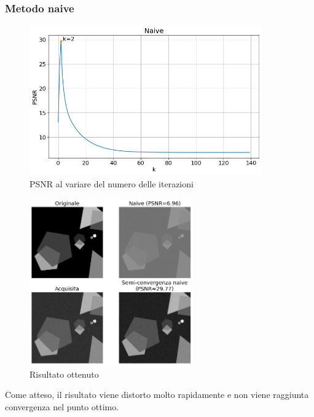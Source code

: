 \documentclass[11pt]{article}
\begin{document}
\subsubsection{Metodo naive}
\begin{figure}[H]
    \centering
    \includegraphics[width=10cm]{semiconvergenza/1/psnr_naive.png}
    \caption{PSNR al variare del numero delle iterazioni}
    \label{fig:semiconv_psnr_naive1}
\end{figure}
\begin{figure}[H]
    \centering
    \includegraphics[width=7cm]{semiconvergenza/1/deblur_naive.png}
    \caption{Risultato ottenuto}
    \label{fig:semiconv_deblur_naive1}
\end{figure}
Come atteso, il risultato viene distorto molto rapidamente e non viene raggiunta convergenza nel punto ottimo.
\end{document}
